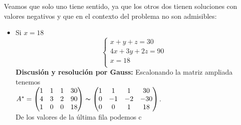 \documentclass[spanish, 11pt]{exam}
\begin{document}
\begin{questions}
\begin{solution}
    Veamos que solo uno tiene sentido, ya que los otros dos tienen soluciones con valores negativos y que en el contexto del problema no son admisibles:
    
    \begin{itemize}
        \item Si $x=18$ \\
        $$\left\{ \begin{matrix}x + y + z = 30 \\ 4 x + 3 y + 2 z = 90 \\ x = 18 \\ \end{matrix}\right.$$
        \textbf{Discusión y resolución por Gauss:} Escalonando la matriz ampliada tenemos\\$A^*= \left(\begin{matrix}1 & 1 & 1 & 30\\4 & 3 & 2 & 90\\1 & 0 & 0 & 18\end{matrix}\right) \thicksim \left(\begin{matrix}1 & 1 & 1 & 30\\0 & -1 & -2 & -30\\0 & 0 & 1 & 18\end{matrix}\right)$. \\  De los valores de la última fila podemos c
\end{itemize}
\end{solution}
\end{questions}
\end{document}
